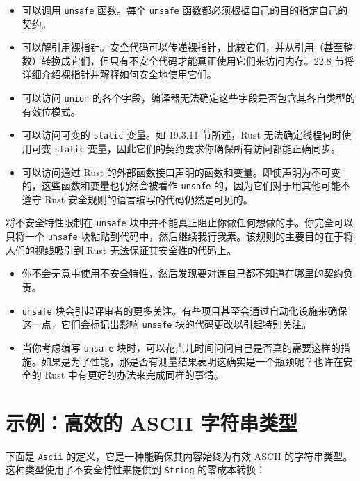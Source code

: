 \begin{itemize}
\item 可以调用 \texttt{unsafe} 函数。每个 \texttt{unsafe} 函数都必须根据自己的目的指定自己的契约。
\item 可以解引用裸指针。安全代码可以传递裸指针，比较它们，并从引用（甚至整数）转换成它们，但只有不安全代码才能真正使用它们来访问内存。22.8 节将详细介绍裸指针并解释如何安全地使用它们。
\item 可以访问 \texttt{union} 的各个字段，编译器无法确定这些字段是否包含其各自类型的有效位模式。
\item 可以访问可变的 \texttt{static} 变量。如 19.3.11 节所述，Rust 无法确定线程何时使用可变 \texttt{static} 变量，因此它们的契约要求你确保所有访问都能正确同步。
\item 可以访问通过 Rust 的外部函数接口声明的函数和变量。即使声明为不可变的，这些函数和变量也仍然会被看作 \texttt{unsafe} 的，因为它们对于用其他可能不遵守 Rust 安全规则的语言编写的代码仍然是可见的。
\end{itemize}

将不安全特性限制在 \texttt{unsafe} 块中并不能真正阻止你做任何想做的事。你完全可以只将一个 \texttt{unsafe} 块粘贴到代码中，然后继续我行我素。该规则的主要目的在于将人们的视线吸引到 Rust 无法保证其安全性的代码上。

\begin{itemize}
\item 你不会无意中使用不安全特性，然后发现要对连自己都不知道在哪里的契约负责。
\item \texttt{unsafe} 块会引起评审者的更多关注。有些项目甚至会通过自动化设施来确保这一点，它们会标记出影响 \texttt{unsafe} 块的代码更改以引起特别关注。
\item 当你考虑编写 \texttt{unsafe} 块时，可以花点儿时间问问自己是否真的需要这样的措施。如果是为了性能，那是否有测量结果表明这确实是一个瓶颈呢？也许在安全的 Rust 中有更好的办法来完成同样的事情。
\end{itemize}

\section{示例：高效的 ASCII 字符串类型}

下面是 \texttt{Ascii} 的定义，它是一种能确保其内容始终为有效 ASCII 的字符串类型。这种类型使用了不安全特性来提供到 \texttt{String} 的零成本转换：

